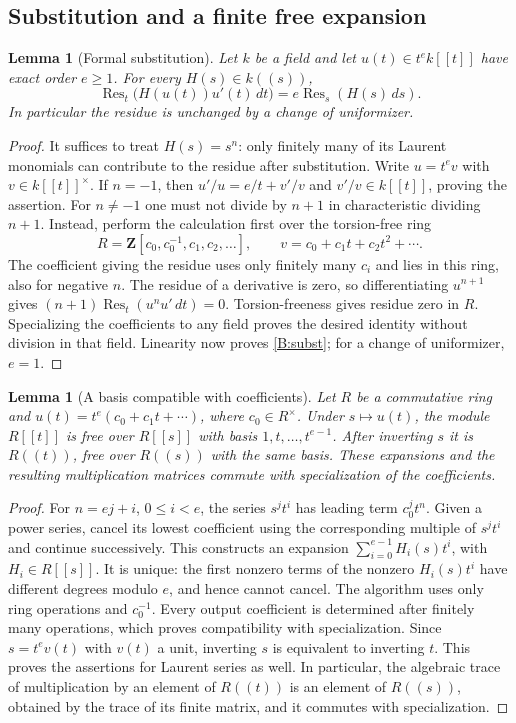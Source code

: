 \documentclass[11pt]{amsart}
\newtheorem{lemma}[theorem]{Lemma}
\theoremstyle{definition}
\theoremstyle{remark}
\newcommand{\Res}{\operatorname{Res}}
\begin{document}
\subsection{Substitution and a finite free expansion}
\begin{lemma}[Formal substitution]\label{B:substitution}
Let $k$ be a field and let $u(t)\in t^e k[[t]]$ have exact order
$e\ge1$. For every $H(s)\in k((s))$,
\begin{equation}\label{B:subst}
 \Res_t\bigl(H(u(t))u'(t)\,dt\bigr)
                         =e\Res_s(H(s)\,ds).
\end{equation}
In particular the residue is unchanged by a change of uniformizer.
\end{lemma}
\begin{proof}
It suffices to treat $H(s)=s^n$: only finitely many of its Laurent
monomials can contribute to the residue after substitution. Write
$u=t^e v$ with $v\in k[[t]]^\times$. If $n=-1$, then
$u'/u=e/t+v'/v$ and $v'/v\in k[[t]]$, proving the assertion.
For $n\ne-1$ one must not divide by $n+1$ in characteristic dividing
$n+1$. Instead, perform the calculation first over the torsion-free
ring
\[
 R=\mathbf Z[c_0,c_0^{-1},c_1,c_2,\ldots],\qquad
 v=c_0+c_1t+c_2t^2+\cdots.
\]
The coefficient giving the residue uses only finitely many $c_i$ and
lies in this ring, also for negative $n$. The residue of a derivative
is zero, so differentiating $u^{n+1}$ gives
$(n+1)\Res_t(u^n u'\,dt)=0$. Torsion-freeness gives residue zero in
$R$. Specializing the coefficients to any field proves the desired
identity without division in that field. Linearity now proves
\eqref{B:subst}; for a change of uniformizer, $e=1$.
\end{proof}

\begin{lemma}[A basis compatible with coefficients]\label{B:free-basis}
Let $R$ be a commutative ring and
$u(t)=t^e(c_0+c_1t+\cdots)$, where $c_0\in R^\times$.
Under $s\mapsto u(t)$, the module $R[[t]]$ is free over $R[[s]]$
with basis $1,t,\ldots,t^{e-1}$. After inverting $s$ it is
$R((t))$, free over $R((s))$ with the same basis. These expansions
and the resulting multiplication matrices commute with specialization
of the coefficients.
\end{lemma}
\begin{proof}
For $n=ej+i$, $0\le i<e$, the series $s^jt^i$ has leading term
$c_0^j t^n$. Given a power series, cancel its lowest coefficient
using the corresponding multiple of $s^jt^i$ and continue successively.
This constructs an expansion $\sum_{i=0}^{e-1}H_i(s)t^i$, with
$H_i\in R[[s]]$. It is unique: the first nonzero terms of the
nonzero $H_i(s)t^i$ have different degrees modulo $e$, and hence
cannot cancel. The algorithm uses only ring operations and $c_0^{-1}$.
Every output coefficient is determined after finitely many operations,
which proves compatibility with specialization.
Since $s=t^e v(t)$ with $v(t)$ a unit, inverting $s$ is equivalent
to inverting $t$. This proves the assertions for Laurent series as well.
In particular, the algebraic trace of multiplication by an element of
$R((t))$ is an element of $R((s))$, obtained by the trace of its finite
matrix, and it commutes with specialization.
\end{proof}
\end{document}
